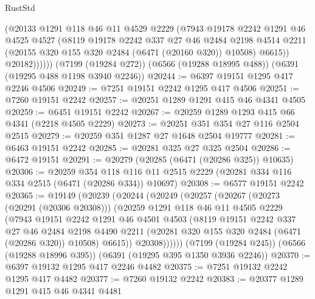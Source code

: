 \begin{lexlean}{RustStd}
\begin{coremodule}
{\begin{coremodule}
{{{{{{{{{{{{{{{{{{{{{{{{{{              (@20133
                @1291
                @118
                @46
                @11
                @4529
                @2229
                (@7943
                  @19178
                  @2242
                  @1291
                  @46
                  @4525
                  @4527
                  (@8119
                    @19178
                    @2242
                    @337
                    @27
                    @46
                    @2484
                    @2198
                    @4514
                    @2211
                    (@20155 @320 @155 @320 @2484 (@6471 (@20160 @320)) @10508)
                    @6615))
                @20182))))))
    (@7199 (@19284 @272))
    (@6566 (@19288 @18995 @488))
    (@6391 (@19295 @488 @1198 @3940 @2246))
@20244 := @6397 @19151 @1295 @417 @2246 @4506
@20249 := @7251 @19151 @2242 @1295 @417 @4506
@20251 := @7260 @19151 @2242
@20257 := @20251 @1289 @1291 @415 @46 @4341 @4505
@20259 := @6451 @19151 @2242
@20267 := @20259 @1289 @1293 @415 @66 @4341 (@2218 @4505 @2229)
@20273 := @20251 @351 @354 @27 @116 @2504 @2515
@20279 := @20259 @351 @1287 @27 @1648 @2504 @19777
@20281 := @6463 @19151 @2242
@20285 := @20281 @325 @27 @325 @2504
@20286 := @6472 @19151
@20291 := @20279 (@20285 (@6471 (@20286 @325)) @10635)
@20306 := @20259
    @354
    @118
    @116
    @11
    @2515
    @2229
    (@20281 @334 @116 @334 @2515 (@6471 (@20286 @334)) @10697)
@20308 := @6577 @19151 @2242
@20365 := @19149
    (@20239
      (@20244
        (@20249
          (@20257
            (@20267
              (@20273 (@20291 (@20306 @20308)))
              (@20259
                @1291
                @118
                @46
                @11
                @4505
                @2229
                (@7943
                  @19151
                  @2242
                  @1291
                  @46
                  @4501
                  @4503
                  (@8119
                    @19151
                    @2242
                    @337
                    @27
                    @46
                    @2484
                    @2198
                    @4490
                    @2211
                    (@20281 @320 @155 @320 @2484 (@6471 (@20286 @320)) @10508)
                    @6615))
                @20308))))))
    (@7199 (@19284 @245))
    (@6566 (@19288 @18996 @395))
    (@6391 (@19295 @395 @1350 @3936 @2246))
@20370 := @6397 @19132 @1295 @417 @2246 @4482
@20375 := @7251 @19132 @2242 @1295 @417 @4482
@20377 := @7260 @19132 @2242
@20383 := @20377 @1289 @1291 @415 @46 @4341 @4481
}}}}}}}}}}}}}}}}}}}}}}}}}}
\end{coremodule}}
\end{coremodule}
\end{lexlean}
